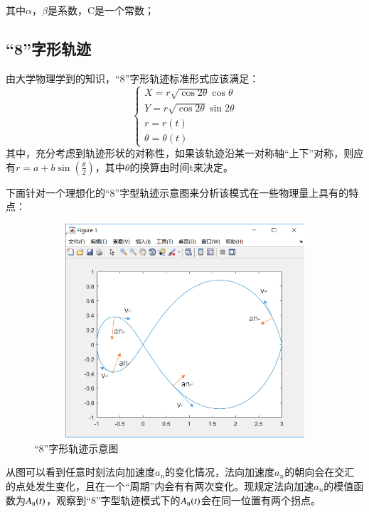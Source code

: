 \documentclass[GBK]{ctexart}
\begin{document}
\begin{spacing}{1.5}
其中$\alpha $，$\beta $是系数，C是一个常数；
\subsection{“8”字形轨迹}
由大学物理学到的知识，“8”字形轨迹标准形式应该满足：
\begin{equation}
\left\{ \begin{array}{l}
X = r\sqrt {\cos 2\theta } \cos \theta \\
Y = r\sqrt {\cos 2\theta } \sin 2\theta \\
r = r(t)\\
\theta  = \theta (t)
\end{array} \right.
\end{equation}
其中，充分考虑到轨迹形状的对称性，如果该轨迹沿某一对称轴“上下”对称，则应有$r = a + b\sin (\frac{\theta }{2})$，其中$\theta $的换算由时间t来决定。%

下面针对一个理想化的“8”字型轨迹示意图来分析该模式在一些物理量上具有的特点：
\begin{figure}[H]
  \centering
  \includegraphics[width=15cm,height=8cm]{8}
  \caption{“8”字形轨迹示意图}\label{8}
\end{figure}
从图可以看到任意时刻法向加速度${a_n}$的变化情况，法向加速度${a_n}$的朝向会在交汇的点处发生变化，且在一个“周期”内会有有两次变化。现规定法向加速${a_n}$的模值函数为${A_{\rm{n}}}(t)$，观察到“8”字型轨迹模式下的${A_{\rm{n}}}(t)$会在同一位置有两个拐点。


\end{spacing}
\end{document}
